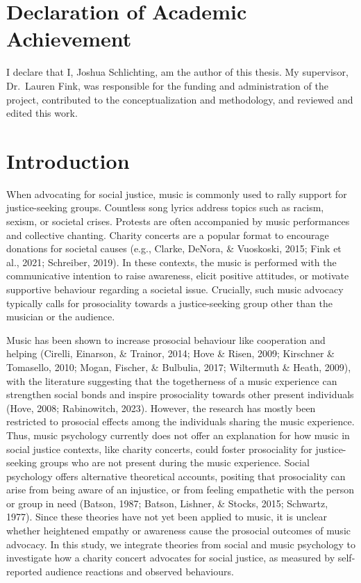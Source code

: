 \documentclass[
  man,floatsintext]{apa6}
\begin{document}
\newpage

\section*{Declaration of Academic Achievement}\label{declaration-of-academic-achievement}

I declare that I, Joshua Schlichting, am the author of this thesis. My supervisor, Dr.~Lauren Fink, was responsible for the funding and administration of the project, contributed to the conceptualization and methodology, and reviewed and edited this work.

\newpage


\section{Introduction}\label{introduction}

When advocating for social justice, music is commonly used to rally support for justice-seeking groups. Countless song lyrics address topics such as racism, sexism, or societal crises. Protests are often accompanied by music performances and collective chanting. Charity concerts are a popular format to encourage donations for societal causes (e.g., Clarke, DeNora, \& Vuoskoski, 2015; Fink et al., 2021; Schreiber, 2019). In these contexts, the music is performed with the communicative intention to raise awareness, elicit positive attitudes, or motivate supportive behaviour regarding a societal issue. Crucially, such music advocacy typically calls for prosociality towards a justice-seeking group other than the musician or the audience.

Music has been shown to increase prosocial behaviour like cooperation and helping (Cirelli, Einarson, \& Trainor, 2014; Hove \& Risen, 2009; Kirschner \& Tomasello, 2010; Mogan, Fischer, \& Bulbulia, 2017; Wiltermuth \& Heath, 2009), with the literature suggesting that the togetherness of a music experience can strengthen social bonds and inspire prosociality towards other present individuals (Hove, 2008; Rabinowitch, 2023). However, the research has mostly been restricted to prosocial effects among the individuals sharing the music experience. Thus, music psychology currently does not offer an explanation for how music in social justice contexts, like charity concerts, could foster prosociality for justice-seeking groups who are not present during the music experience. Social psychology offers alternative theoretical accounts, positing that prosociality can arise from being aware of an injustice, or from feeling empathetic with the person or group in need (Batson, 1987; Batson, Lishner, \& Stocks, 2015; Schwartz, 1977). Since these theories have not yet been applied to music, it is unclear whether heightened empathy or awareness cause the prosocial outcomes of music advocacy. In this study, we integrate theories from social and music psychology to investigate how a charity concert advocates for social justice, as measured by self-reported audience reactions and observed behaviours.
\end{document}
